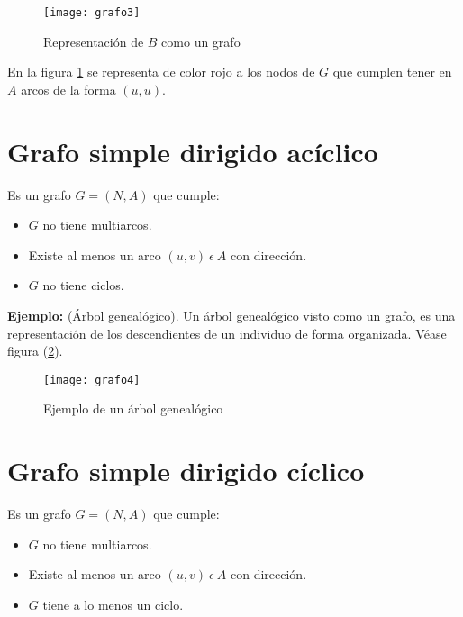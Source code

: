 \documentclass[a4paper, 11pt]{article}
\begin{document}
\begin{figure}[H]
  \centering
    \texttt{[image: grafo3]}
  \caption{Representación de $B$ como un grafo}
  \label{imagen3}
\end{figure}

En la figura \ref{imagen3} se representa de color rojo a los nodos de $G$ que cumplen tener en $A$ arcos de la forma $(u, u)$.





\section*{Grafo simple dirigido acíclico }

Es un grafo $G = (N, A)$ que cumple:
\begin{itemize}
\item $G$ no tiene multiarcos.
\item Existe al menos un arco $(u, v) \ \epsilon \ A$ con dirección.
\item $G$ no tiene ciclos.
\end{itemize}


\textbf{Ejemplo:} (Árbol genealógico). Un árbol genealógico visto como un grafo, es una representación de los descendientes de un individuo de forma organizada. Véase figura (\ref{imagen4}).

\begin{figure}[H]
  \centering
    \texttt{[image: grafo4]}
  \caption{Ejemplo de un árbol genealógico}
  \label{imagen4}
\end{figure}





\section*{Grafo simple dirigido cíclico}

Es un grafo $G = (N, A)$ que cumple:
\begin{itemize}
\item $G$ no tiene multiarcos.
\item Existe al menos un arco $(u, v) \ \epsilon \ A$ con dirección.
\item $G$ tiene a lo menos un ciclo.
\end{itemize}
\end{document}

